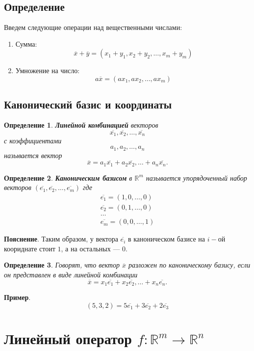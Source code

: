 \documentclass[]{article}
\newtheorem{dfn}{Определение}
\begin{document}
	\subsection{Определение}
	Введем следующие операции над вещественными числами:\begin{enumerate}
		\item Сумма: $$\overline{x}+\overline{y}=
		(x_1+y_1, x_2+y_2, \ldots, x_m+y_m)$$
		\item Умножение на число: $$a\overline{x}=
		(ax_1, ax_2, \ldots, ax_m)$$
	\end{enumerate}
	
	\subsection{Канонический базис и координаты}
	\begin{dfn}
		\textbf{Линейной комбинацией} векторов 
		$$
		\overline{x_1}, \overline{x_2},\ldots, \overline{x_n}
		$$
		с коэффициентами 
		$$
		a_1,a_2,\ldots, a_n
		$$
		называется вектор $$\overline{x}=a_1\overline{x_1}+ a_2\overline{x_2},\ldots+ a_n\overline{x_n}.$$
	\end{dfn}
	
	\begin{dfn}
		\textbf{Каноническим базисом} в $\mathbb{R}^m$ называется упорядоченный набор векторов $(\overline{e_1}, \overline{e_2}, \ldots, \overline{e_m})$ где
		\begin{gather*}
			\overline{e_1} = (1,0,\ldots,0)
			\\
			\overline{e_2} = (0,1,\ldots,0)
			\\
			\ldots
			\\
			\overline{e_m} = (0,0,\ldots,1)
		\end{gather*}
	\end{dfn}
	\textbf{Пояснение}. Таким образом, у вектора $\overline{e_i}$ в каноническом базисе на $i-$ой коориднате стоит $1$, а на остальных --- $0$.
	
	\begin{dfn}
		Говорят, что вектор $\overline{x}$ разложен по каноническому базису, если он представлен в виде линейной комбинации
		$$\overline{x}=x_1\overline{e_1}+ x_2\overline{e_2},\ldots+ x_n\overline{e_n}.$$
	\end{dfn}
	\textbf{Пример}.
	\begin{equation*}
		(5,3,2) = 5\overline{e_1}+3\overline{e_2}+2\overline{e_3}
	\end{equation*} 
	
	\section{Линейный оператор $f:\mathbb{R}^m\rightarrow\mathbb{R}^n$}
\end{document}
